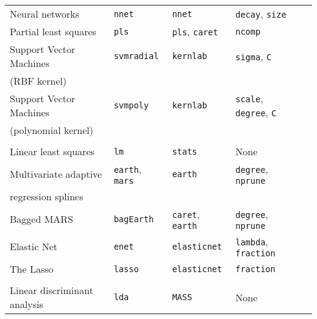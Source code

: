 \documentclass[12pt]{article}
\begin{document}
\begin{table}[hp]
\begin{center}
\begin{tabular}{lllll}
      Neural networks &               
         \texttt{nnet} & 
            \texttt{nnet}       &       
            \texttt{decay}, \texttt{size} \\      
      
      Partial least squares &
         \texttt{pls} & 
            \texttt{pls}, \texttt{caret}       & 
            \texttt{ncomp} \\      
      
      Support Vector Machines  &
         \texttt{svmradial} & 
            \texttt{kernlab}       & 
            \texttt{sigma}, \texttt{C} \\            
      \:\: (RBF kernel) \\   
      
      Support Vector Machines  &
         \texttt{svmpoly} & 
            \texttt{kernlab}       & 
            \texttt{scale}, \texttt{degree}, \texttt{C} \\            
      \:\: (polynomial kernel) \\         
      
      \\
      
      Linear least squares &
         \texttt{lm} & 
            \texttt{stats}       & 
            None \\         
      
      Multivariate adaptive  &
         \texttt{earth}, \texttt{mars} & 
            \texttt{earth}       & 
            \texttt{degree}, \texttt{nprune} \\            
      \:\: regression splines \\
            
      Bagged MARS &
         \texttt{bagEarth} & 
            \texttt{caret},  \texttt{earth}      & 
            \texttt{degree}, \texttt{nprune} \\          
      
      Elastic Net &
         \texttt{enet} & 
            \texttt{elasticnet}      & 
            \texttt{lambda}, \texttt{fraction} \\          

      The Lasso &
         \texttt{lasso} & 
            \texttt{elasticnet}      & 
            \texttt{fraction} \\          

      \\       
             

      Linear discriminant analysis &
         \texttt{lda} & 
            \texttt{MASS}       &          
            None\\                     
            

\end{tabular}
\end{center}
\end{table}
\end{document}
